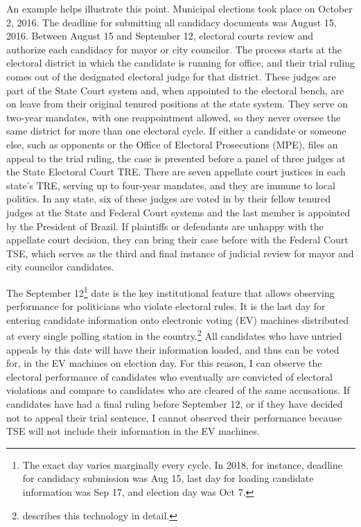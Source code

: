 \documentclass[11pt]{article}
\begin{document}
An example helps illustrate this point. Municipal elections took place on October 2, 2016. The deadline for submitting all candidacy documents was August 15, 2016. Between August 15 and September 12, electoral courts review and authorize each candidacy for mayor or city councilor. The process starts at the electoral district in which the candidate is running for office, and their trial ruling comes out of the designated electoral judge for that district. These judges are part of the State Court system and, when appointed to the electoral bench, are on leave from their original tenured positions at the state system. They serve on two-year mandates, with one reappointment allowed, so they never oversee the same district for more than one electoral cycle. If either a candidate or someone else, such as opponents or the Office of Electoral Prosecutions (MPE), files an appeal to the trial ruling, the case is presented before a panel of three judges at the State Electoral Court TRE. There are seven appellate court justices in each state's TRE, serving up to four-year mandates, and they are immune to local politics. In any state, six of these judges are voted in by their fellow tenured judges at the State and Federal Court systems and the last member is appointed by the President of Brazil. If plaintiffs or defendants are unhappy with the appellate court decision, they can bring their case before with the Federal Court TSE, which serves as the third and final instance of judicial review for mayor and city councilor candidates.

The September 12\footnote{The exact day varies marginally every cycle. In 2018, for instance, deadline for candidacy submission was Aug 15, last day for loading candidate information was Sep 17, and election day was Oct 7.} date is the key institutional feature that allows observing performance for politicians who violate electoral rules. It is the last day for entering candidate information onto electronic voting (EV) machines distributed at every single polling station in the country.\footnote{\citet{FujiwaraVotingTechnologyPolitical2015} describes this technology in detail.} All candidates who have untried appeals by this date will have their information loaded, and thus can be voted for, in the EV machines on election day. For this reason, I can observe the electoral performance of candidates who eventually are convicted of electoral violations and compare to candidates who are cleared of the same accusations. If candidates have had a final ruling before September 12, or if they have decided not to appeal their trial sentence, I cannot observed their performance because TSE will not include their information in the EV machines.
\end{document}
